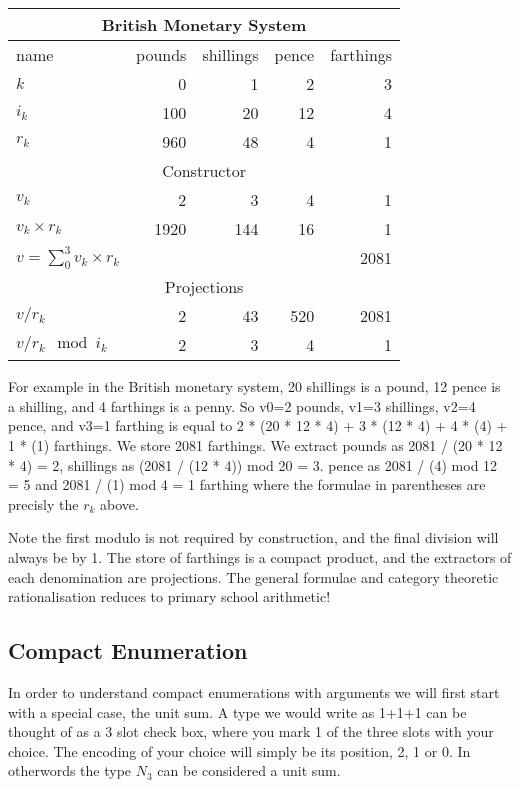\documentclass[oneside]{book}
\theoremstyle{plain}
\theoremstyle{definition}
\theoremstyle{plain}
\begin{document}
\begin{center}
\begin{tabular}{|l|r|r|r|r|}
\hline
\multicolumn{5}{|c|}{British Monetary System}\\
\hline
name & pounds & shillings & pence & farthings \\
$k$&0&1&2&3\\ 
$i_k$&  100 &  20 & 12 & 4 \\ 
$r_k$         &   960 & 48  & 4  & 1 \\ \hline

\multicolumn{5}{|c|}{Constructor}\\ \hline
$v_k$& 2     &  3  &  4  & 1 \\
$v_k\times r_k$ & 1920 & 144 & 16 &  1 \\ \hline
$v=\sum_0^3v_k\times r_k$&\multicolumn{3}{|c|}{}&2081\\ \hline
\multicolumn{5}{|c|}{Projections}\\ \hline
$v/r_k$& 2 & 43 & 520 & 2081 \\
$v/r_k\mod i_k$&2&3&4&1\\
\hline
\end{tabular}
\end{center}

For example in the British monetary system, 20 shillings is a pound, 
12 pence is a shilling, and 4 farthings is a penny. So v0=2 pounds, v1=3 shillings, v2=4 pence,
and v3=1 farthing is equal to 2 * (20 * 12 * 4) + 3 * (12 * 4) + 4 * (4) + 1 * (1) farthings.
We store 2081 farthings. We extract pounds as 2081 / (20 * 12 * 4) = 2, shillings as
(2081 / (12 * 4)) mod 20 = 3. pence as 2081 / (4) mod 12 = 5 and 2081 / (1) mod 4 = 1 farthing
where the formulae in parentheses are precisly the $r_k$ above. 

Note the first modulo is not required by construction, and the final division will 
always be by 1. The store of farthings is a compact product, and the extractors
of each denomination are projections. The general formulae and category theoretic
rationalisation reduces to primary school arithmetic!



\subsection{Compact Enumeration}
In order to understand compact enumerations with arguments we will first start 
with a special case, the unit sum. A type we would write as 1+1+1 can be thought
of as a 3 slot check box, where you mark 1 of the three slots with your choice.
The encoding of your choice will simply be its position, 2, 1 or 0.
In otherwords the type $N_3$ can be considered a unit sum.
\end{document}
